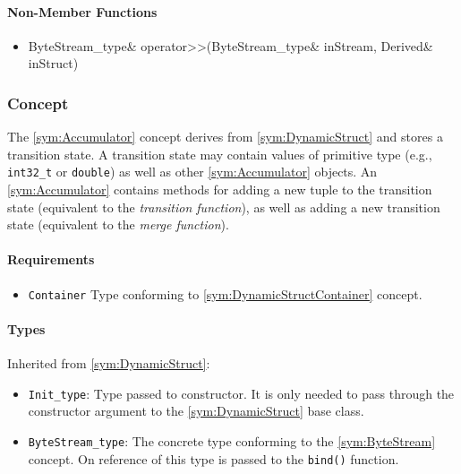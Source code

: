 \paragraph{Non-Member Functions}

\begin{itemize}
	\item
		\begin{cppsnippet}
		ByteStream_type& operator>>(ByteStream_type& inStream, Derived& inStruct)
		\end{cppsnippet}
\end{itemize}


\subsubsection[Concept Accumulator]{Concept }

The \ref{sym:Accumulator} concept derives from \ref{sym:DynamicStruct} and stores a transition state. A transition state may contain values of primitive type (e.g., \texttt{int32\_t} or \texttt{double}) as well as other \ref{sym:Accumulator} objects. An \ref{sym:Accumulator} contains methods for adding a new tuple to the transition state (equivalent to the \emph{transition function}), as well as adding a new transition state (equivalent to the \emph{merge function}).


\paragraph{Requirements}

\begin{itemize}
	\item \texttt{Container} Type conforming to \ref{sym:DynamicStructContainer} concept.
\end{itemize}

\paragraph{Types}

Inherited from \ref{sym:DynamicStruct}:
\begin{itemize}
	\item \texttt{Init\_type}: Type passed to constructor. It is only needed to pass through the constructor argument to the \ref{sym:DynamicStruct} base class.
	\item \texttt{ByteStream\_type}: The concrete type conforming to the \ref{sym:ByteStream} concept. On reference of this type is passed to the \texttt{bind()} function.
\end{itemize}

